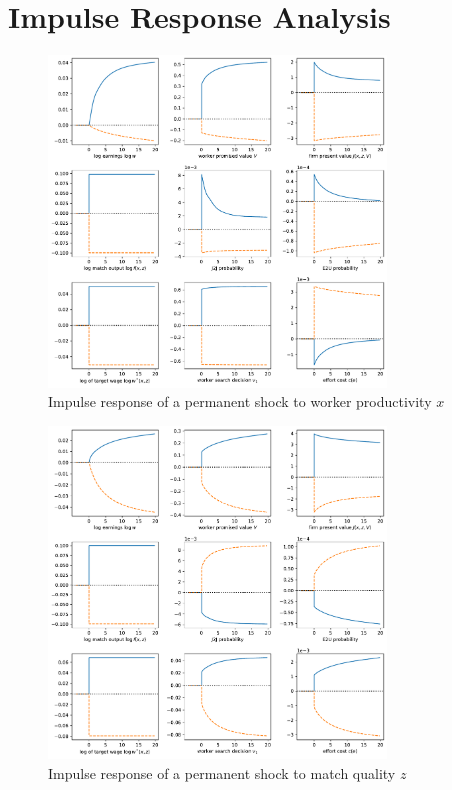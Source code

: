 \documentclass{article}
\begin{document}
\newpage 

\section{Impulse Response Analysis}

\begin{figure}[htpb]
    \centering
    \includegraphics[width=0.8\textwidth]{figures/figure3-ir-xshock.pdf}
    \caption{Impulse response of a permanent shock to worker productivity $x$}
    \label{fig:impulse_response_x}
\end{figure}

\begin{figure}[htpb]
    \centering
    \includegraphics[width=0.8\textwidth]{figures/figure4-ir-zshock.pdf}
    \caption{Impulse response of a permanent shock to match quality $z$}
    \label{fig:impulse_response_z}
\end{figure}
\end{document}
